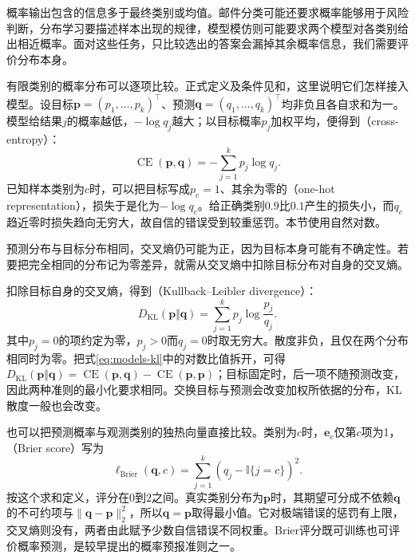 概率输出包含的信息多于最终类别或均值。邮件分类可能还要求概率能够用于风险判断，分布学习要描述样本出现的规律，模型模仿则可能要求两个模型对各类别给出相近概率。面对这些任务，只比较选出的答案会漏掉其余概率信息，我们需要评价分布本身。

有限类别的概率分布可以逐项比较。正式定义及条件见和，这里说明它们怎样接入模型。设目标$\bm p=(p_1,\ldots,p_k)^{\top}$、预测$\bm q=(q_1,\ldots,q_k)^{\top}$均非负且各自求和为一。模型给结果$j$的概率越低，$-\log q_j$越大；以目标概率$p_j$加权平均，便得到（cross-entropy）：
\begin{equation}
  \operatorname{CE}(\bm{p},\bm{q})=-\sum_{j=1}^{k}p_j\log q_j.
  \label{eq:models-cross-entropy}
\end{equation}
已知样本类别为$c$时，可以把目标写成$p_c=1$、其余为零的（one-hot representation），损失于是化为$-\log q_c$。给正确类别$0.9$比$0.1$产生的损失小，而$q_c$趋近零时损失趋向无穷大，故自信的错误受到较重惩罚。本节使用自然对数。

预测分布与目标分布相同，交叉熵仍可能为正，因为目标本身可能有不确定性。若要把完全相同的分布记为零差异，就需从交叉熵中扣除目标分布对自身的交叉熵。

扣除目标自身的交叉熵，得到（Kullback--Leibler divergence）：
\begin{equation}
  D_{\mathrm{KL}}(\bm{p}\Vert\bm{q})
  =\sum_{j=1}^{k}p_j\log\frac{p_j}{q_j}.
  \label{eq:models-kl}
\end{equation}
其中$p_j=0$的项约定为零，$p_j>0$而$q_j=0$时取无穷大。散度非负，且仅在两个分布相同时为零。把式\eqref{eq:models-kl}中的对数比值拆开，可得$D_{\mathrm{KL}}(\bm p\Vert\bm q)=\operatorname{CE}(\bm p,\bm q)-\operatorname{CE}(\bm p,\bm p)$；目标固定时，后一项不随预测改变，因此两种准则的最小化要求相同。交换目标与预测会改变加权所依据的分布，KL散度一般也会改变。

也可以把预测概率与观测类别的独热向量直接比较。类别为$c$时，$\bm e_c$仅第$c$项为1，（Brier score）写为
\begin{equation}
  \ell_{\mathrm{Brier}}(\bm{q},c)
  =\sum_{j=1}^{k}(q_j-\mathbb I\{j=c\})^2.
  \label{eq:models-brier}
\end{equation}
按这个求和定义，评分在$0$到$2$之间。真实类别分布为$\bm p$时，其期望可分成不依赖$\bm q$的不可约项与$\|\bm q-\bm p\|_2^2$，所以$\bm q=\bm p$取得最小值。它对极端错误的惩罚有上限，交叉熵则没有，两者由此赋予少数自信错误不同权重。Brier评分既可训练也可评价概率预测，是较早提出的概率预报准则之一。

